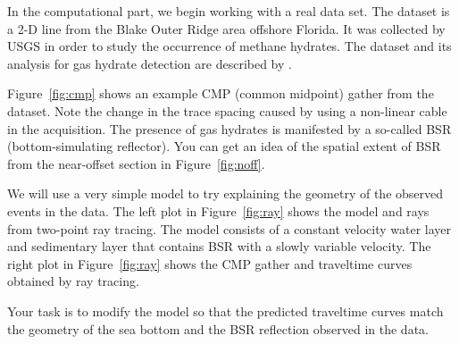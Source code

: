 
In the computational part, we begin working with a real data
set. The dataset is a 2-D line from the Blake Outer Ridge area
offshore Florida. It was collected by USGS in order to study the
occurrence of methane hydrates. The dataset and its analysis for gas
hydrate detection are described by
\cite{GEO63-05-16591669,GEO65-02-05650573}.

Figure~\ref{fig:cmp} shows an example CMP (common midpoint) gather
from the dataset. Note the change in the trace spacing caused by using
a non-linear cable in the acquisition. The presence of gas hydrates is
manifested by a so-called BSR (bottom-simulating reflector). You can
get an idea of the spatial extent of BSR from the near-offset section
in Figure~\ref{fig:noff}.



We will use a very simple model to try explaining the geometry of the
observed events in the data. The left plot in Figure~\ref{fig:ray}
shows the model and rays from two-point ray tracing. The model
consists of a constant velocity water layer and sedimentary layer that
contains BSR with a slowly variable velocity. The right plot in
Figure~\ref{fig:ray} shows the CMP gather and traveltime curves
obtained by ray tracing. 


Your task is to modify the model so that the predicted traveltime
curves match the geometry of the sea bottom and the BSR reflection
observed in the data.

